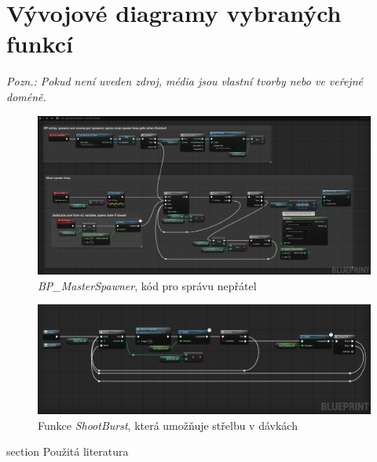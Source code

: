 \documentclass[12pt,a4paper,hidelinks]{article}
\begin{document}
\section{Vývojové diagramy vybraných funkcí}
\textit{Pozn.: Pokud není uveden zdroj, média jsou vlastní tvorby nebo ve veřejné doméně.}
\begin{landscape}
\begin{figure}[h!]
\centering
\includegraphics[width=1.0\linewidth]{images/masterspawner_nodesc.png}
\caption{\textit{BP{\_}MasterSpawner}, kód pro správu nepřátel}
\label{masterspawner}
\end{figure}
\clearpage

\begin{figure}[h!]
\centering
\includegraphics[width=1.0\linewidth]{images/shoot_burst.png}
\caption{Funkce \textit{ShootBurst}, která umožňuje střelbu v dávkách}
\label{burst}
\end{figure}
\clearpage
\end{landscape}


\printbibliography
{} {section} {Použitá literatura}
\end{document}
